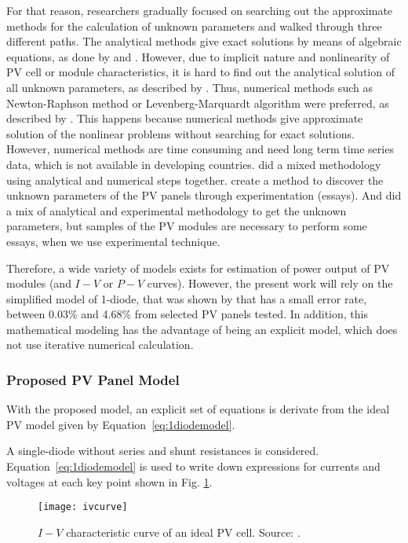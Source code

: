 For that reason, researchers gradually focused on searching out the approximate methods for the calculation of unknown parameters and walked through three different paths. The analytical methods give exact solutions by means of algebraic equations, as done by \cite{Cubas} and \cite{Brano}. However, due to implicit nature and nonlinearity of PV cell or module characteristics, it is hard to find out the analytical solution of all unknown parameters, as described by \cite{Hasan}. Thus, numerical methods such as Newton-Raphson method or Levenberg-Marquardt algorithm were preferred, as described by \cite{Mellit}. This happens because numerical methods give approximate solution of the nonlinear problems without searching for exact solutions. However, numerical methods are time consuming and need long term time series data, which is not available in developing countries. \cite{Jakhrani} did a mixed methodology using analytical and numerical steps together.  \cite{Shenawy} create a method to discover the unknown parameters of the PV panels through experimentation (essays). And \cite{Tian} did a mix of analytical and experimental methodology to get the unknown parameters, but samples of the PV modules are necessary to perform some essays, when we use experimental technique. 

Therefore, a wide variety of models exists for estimation of power output of PV modules (and $I-V$ or $P-V$ curves). However, the present work will rely on the simplified model of 1-diode, that was shown by \cite{Saloux} that has a small error rate, between 0.03\% and 4.68\% from selected PV panels tested. In addition, this mathematical modeling has the advantage of being an explicit model, which does not use iterative numerical calculation. 

\subsubsection{Proposed PV Panel Model}

With the proposed model, an explicit set of equations is derivate from the ideal PV model given by Equation~\ref{eq:1diodemodel}.

A single-diode without series and shunt resistances is considered. Equation~\ref{eq:1diodemodel} is used to write down expressions for currents and voltages at each key point shown in Fig. \ref{fig:ivcurve}.

\begin{figure}[h]
\texttt{[image: ivcurve]}
\centering
\caption{$ I-V $ characteristic curve of an ideal PV cell. Source: \cite{Saloux}.}
\label{fig:ivcurve}
\end{figure}

